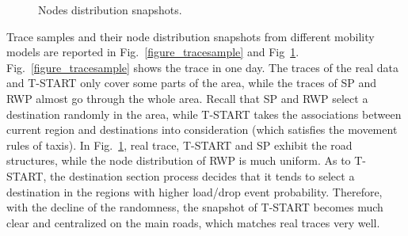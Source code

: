 \begin{figure}[!t]
\centering
{}
\caption{Nodes distribution snapshots.}\label{figure_trace_snapshots}
\end{figure}
Trace samples and their node distribution snapshots from different mobility models are reported in Fig.~\ref{figure_tracesample} and Fig~\ref{figure_trace_snapshots}. Fig.~\ref{figure_tracesample} shows the trace in one day. The traces of the real data and T-START only cover some parts of the area, while the traces of SP and RWP almost go through the whole area. Recall that SP and RWP select a destination randomly in the area, while T-START takes the associations between current region and destinations into consideration (which satisfies the movement rules of taxis). In Fig.~\ref{figure_trace_snapshots}, real trace, T-START and SP exhibit the road structures, while the node distribution of RWP is much uniform. As to T-START, the destination section process decides that it tends to select a destination in the regions with higher load/drop event probability. Therefore, with the decline of the randomness, the snapshot of T-START becomes much clear and centralized on the main roads, which matches real traces very well.

